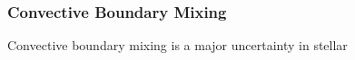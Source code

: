 {\color{purple}
\subsubsection{Convective Boundary Mixing}
}

Convective boundary mixing is a major uncertainty in stellar 

